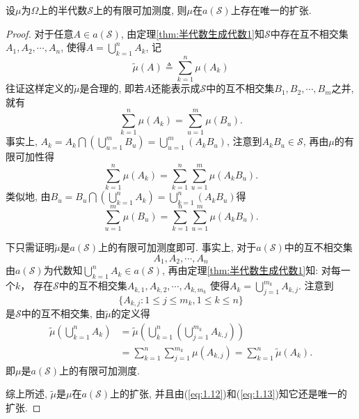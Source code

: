\begin{theorem}
	\label{thm:121}设$\mu$为$\Omega$上的半代数$\mathscr{S}$上的有限可加测度, 则$\mu$在$a(\mathscr{S})$上存在唯一的扩张.
\end{theorem}
\begin{proof}
	对于任意$A\in a(\mathscr{S})$, 由定理\ref{thm:半代数生成代数1}知$\mathscr{S}$中存在互不相交集$A_1, A_2, \cdots, A_n$, 使得$A = \bigcup_{k=1}^nA_k$, 记
	\begin{equation}
		\tilde{\mu}(A)\triangleq \sum_{k=1}^n\mu(A_k)\label{eq:1.12}
	\end{equation}
	往证这样定义的$\tilde{\mu}$是合理的, 即若$A$还能表示成$\mathscr{S}$中的互不相交集$B_1,B_2,\cdots,B_m$之并, 就有
	\begin{equation}
		\sum_{k=1}^n\mu(A_k) = \sum_{u=1}^m\mu(B_u).\label{eq:1.13}
	\end{equation}
	事实上, $A_k = A_k\bigcap\left( \bigcup_{u=1}^mB_u \right) = \bigcup_{u=1}^m(A_kB_u)$, 注意到$A_kB_u\in\mathscr{S}$, 再由$\mu$的有限可加性得
	\begin{equation}
		\sum_{k=1}^n\mu(A_k) = \sum_{k=1}^n\sum_{u=1}^m\mu(A_kB_u).
	\end{equation}
	类似地, 由$B_u = B_u\bigcap\left( \bigcup_{k=1}^nA_k \right) = \bigcup_{k=1}^n(A_kB_u)$得
	\begin{equation}
		\sum_{u=1}^m\mu(B_u) = \sum_{k=1}^n\sum_{u=1}^m\mu(A_kB_u).	
	\end{equation}

	下只需证明$\tilde{\mu}$是$a(\mathscr{S})$上的有限可加测度即可. 事实上, 对于$a(\mathscr{S})$中的互不相交集
	\begin{equation}
		A_1,A_2,\cdots,A_n
	\end{equation}
	由$a(\mathscr{S})$为代数知$\bigcup_{k=1}^nA_k\in a(\mathscr{S})$, 再由定理\ref{thm:半代数生成代数1}知:
	对每一个$k$， 存在$\mathscr{S}$中的互不相交集$A_{k,1}, A_{k,2},\cdots, A_{k,m_k}$ 使得$A_k = \bigcup_{j=1}^{m_k}A_{k,j}$.
	注意到\begin{equation}
		\{A_{k,j}:1\leqslant j\leqslant m_k,1\leqslant k\leqslant n \}
	\end{equation}
	是$\mathscr{S}$中的互不相交集, 由$\tilde{\mu}$的定义得
	\begin{align}
		\tilde{\mu}\left( \bigcup_{k=1}^n A_k \right) &= \tilde{\mu}\left( \bigcup_{k=1}^n\left( \bigcup_{j=1}^{m_k}A_{k,j} \right) \right)\nonumber\\
		&= \sum_{k=1}^n\sum_{j=1}^{m_k}\mu(A_{k,j}) = \sum_{k=1}^n\tilde{\mu}(A_k).
	\end{align}
	即$\mu$是$a(\mathscr{S})$上的有限可加测度.

	综上所述, $\tilde{\mu}$是$\mu$在$a(\mathscr{S})$上的扩张, 并且由(\ref{eq:1.12})和(\ref{eq:1.13})知它还是唯一的扩张.
\end{proof}

